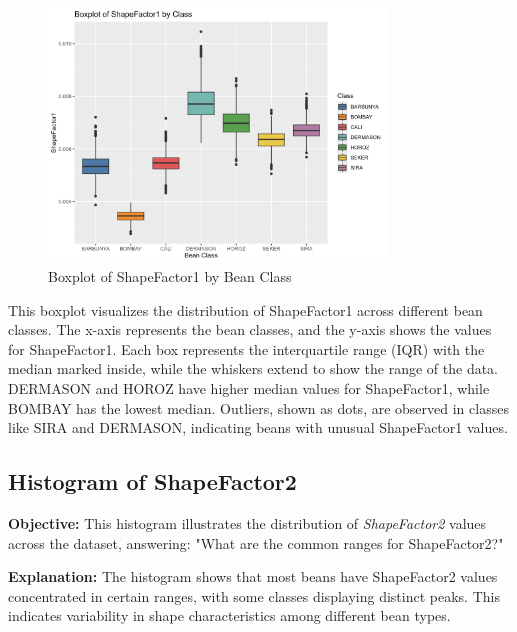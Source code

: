 \documentclass[a4paper,12pt]{article}
\begin{document}
\begin{figure}[H]
    \centering
    \includegraphics[width=0.8\textwidth]{graphs/boxplot_shapefactor1.png}
    \caption{Boxplot of ShapeFactor1 by Bean Class}
    \label{fig:boxplot_shapefactor1}
\end{figure}
This boxplot visualizes the distribution of ShapeFactor1 across different bean classes. The x-axis represents the bean classes, and the y-axis shows the values for ShapeFactor1. Each box represents the interquartile range (IQR) with the median marked inside, while the whiskers extend to show the range of the data. DERMASON and HOROZ have higher median values for ShapeFactor1, while BOMBAY has the lowest median. Outliers, shown as dots, are observed in classes like SIRA and DERMASON, indicating beans with unusual ShapeFactor1 values.

\newpage

\subsection{Histogram of ShapeFactor2}
\noindent\textbf{Objective:} This histogram illustrates the distribution of \textit{ShapeFactor2} values across the dataset, answering: "What are the common ranges for ShapeFactor2?"

\noindent\textbf{Explanation:} The histogram shows that most beans have ShapeFactor2 values concentrated in certain ranges, with some classes displaying distinct peaks. This indicates variability in shape characteristics among different bean types.
\end{document}
